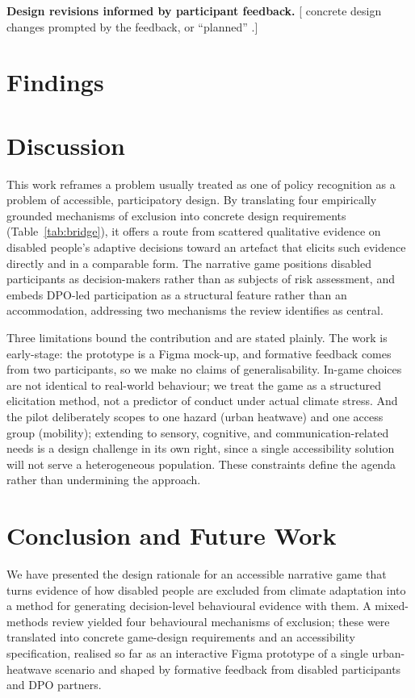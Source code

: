 \documentclass[sigconf]{acmart}
\begin{document}
\textbf{Design revisions informed by participant feedback.} [ concrete design changes
prompted by the feedback, or ``planned'' .]

\section{Findings}

\section{Discussion}
This work reframes a problem usually treated as one of policy recognition
as a problem of accessible, participatory design. By translating four
empirically grounded mechanisms of exclusion into concrete design
requirements (Table~\ref{tab:bridge}), it offers a route from scattered
qualitative evidence on disabled people's adaptive decisions toward an
artefact that elicits such evidence directly and in a comparable form.
The narrative game positions disabled participants as decision-makers
rather than as subjects of risk assessment, and embeds DPO-led
participation as a structural feature rather than an accommodation,
addressing two mechanisms the review identifies as central.

Three limitations bound the contribution and are stated plainly. The work
is early-stage: the prototype is a Figma mock-up, and formative feedback
comes from two participants, so we make no claims of generalisability.
In-game choices are not identical to real-world behaviour; we treat the
game as a structured elicitation method, not a predictor of conduct under
actual climate stress. And the pilot deliberately scopes to one hazard
(urban heatwave) and one access group (mobility); extending to sensory,
cognitive, and communication-related needs is a design challenge in its
own right, since a single accessibility solution will not serve a
heterogeneous population. These constraints define the agenda rather than
undermining the approach.

\section{Conclusion and Future Work}
We have presented the design rationale for an accessible narrative game
that turns evidence of how disabled people are excluded from climate
adaptation into a method for generating decision-level behavioural
evidence with them. A mixed-methods review yielded four behavioural
mechanisms of exclusion; these were translated into concrete game-design
requirements and an accessibility specification, realised so far as an
interactive Figma prototype of a single urban-heatwave scenario and
shaped by formative feedback from disabled participants and DPO partners.
\end{document}

